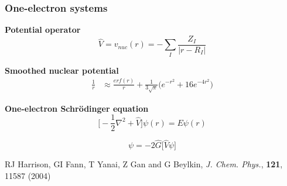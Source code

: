 \documentclass[mathserif, 10pt]{beamer}
\begin{document}
\begin{frame}
    \frametitle{One-electron systems}
    \centering
    \textbf{Potential operator}
    \begin{equation}
	\nonumber
	\hat{V} = v_{nuc}(r) = -\sum_I\frac{Z_I}{|r-R_I|}
    \end{equation}

    \vspace{5mm}

    \textbf{Smoothed nuclear potential}
    \begin{align}
	\nonumber
	\frac{1}{r} &\approx \frac{erf(r)}{r} +
	\frac{1}{3\sqrt{\pi}}\big(e^{-r^2}+16e^{-4r^2}\big)
    \end{align}

    \vspace{5mm}

    \textbf{One-electron Schr\"{o}dinger equation}
    \begin{equation}
        \nonumber
        \Big[-\frac{1}{2}\nabla^2 + \hat{V}\Big]\psi(r) = E \psi(r)
    \end{equation}

    \vspace{1mm}

    \begin{equation}
        \nonumber
        \psi = -2\hat{G} \Big[\hat{V} \psi \Big]
    \end{equation}

    \vspace{5mm}

    \centering
    \tiny
    RJ Harrison, GI Fann, T Yanai, Z Gan and G Beylkin,
    {\it J. Chem. Phys.}, 
    \textbf{121},
    11587 (2004)
\end{frame}
\end{document}
